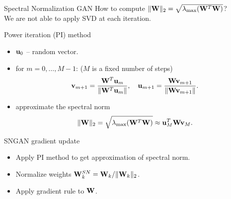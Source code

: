 \documentclass{beamer}
\begin{document}
\begin{frame}{Spectral Normalization GAN}
	How to compute $ \| \mathbf{W} \|_2 = \sqrt{\lambda_{\text{max}}(\mathbf{W}^T \mathbf{W})}$? \\
	We are not able to apply SVD at each iteration.
	 \begin{block}{Power iteration (PI) method}
	 	\vspace{-0.2cm}
	 	\begin{itemize}
	 		\item $\mathbf{u}_0$ -- random vector.
	 		\item for $m = 0, \dots, M - 1$: ($M$ is a fixed number of steps)
	 		\vspace{-0.3cm}
	 		\[
	 			\mathbf{v}_{m+1} = \frac{\mathbf{W}^T \mathbf{u}_{m}}{\| \mathbf{W}^T \mathbf{u}_{m} \|}, \quad \mathbf{u}_{m+1} = \frac{\mathbf{W} \mathbf{v}_{m+1}}{\| \mathbf{W} \mathbf{v}_{m+1} \|}.
	 		\]
	 		\item approximate the spectral norm
	 		\vspace{-0.3cm}
	 		\[
	 			\| \mathbf{W} \|_2 = \sqrt{\lambda_{\text{max}}(\mathbf{W}^T \mathbf{W})} \approx \mathbf{u}_{M}^T \mathbf{W} \mathbf{v}_{M}.
	 		\]
	 	\end{itemize}
	 \end{block}
	 \vspace{-0.5cm}
 	\begin{block}{SNGAN gradient update}
 		\begin{itemize}
 			\item Apply PI method to get approximation of spectral norm.
 			\item Normalize weights $\mathbf{W}^{SN}_k = \mathbf{W}_k / \|\mathbf{W}_k\|_2$.
 			\item Apply gradient rule to $\mathbf{W}$.
 		\end{itemize}
 	\end{block}

\end{frame}
\end{document}
